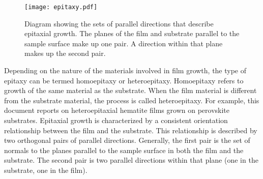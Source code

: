 \begin{figure}
\begin{center}
\texttt{[image: epitaxy.pdf]}
\caption[Orientation relationships in epitaxy]{%
	Diagram showing the sets of parallel directions that describe epitaxial 
	growth. The planes of the film and substrate parallel to the sample surface
	make up one pair. A direction within that plane makes up the second pair. }
\label{fig:epitaxy}
\end{center}
\end{figure}
Depending on the nature of the materials involved in film growth, the type of epitaxy can be termed homoepitaxy or heteroepitaxy. Homoepitaxy refers to growth of the same material as the substrate. When the film material is different from the substrate material, the process is called heteroepitaxy. For example, this document reports on heteroepitaxial hematite films grown on perovskite substrates. Epitaxial growth is characterized by a consistent orientation relationship between the film and the substrate. This relationship is described by two orthogonal pairs of parallel directions. Generally, the first pair is the set of normals to the planes parallel to the sample surface in both the film and the substrate. The second pair is two parallel directions within that plane (one in the substrate, one in the film). 

